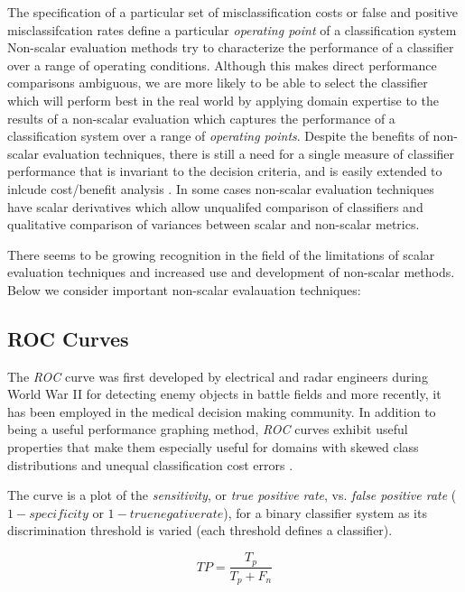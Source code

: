 \documentclass[10pt]{unbthesis}
\begin{document}
The specification of a particular set of
misclassification costs or false and positive misclassifcation rates
define a particular \textit{operating point} of a classification system
Non-scalar evaluation methods try to characterize the performance of a
classifier over a range of operating conditions. Although this makes
direct performance comparisons ambiguous, we are more likely to be
able to select the classifier which will perform best in the real
world by applying domain expertise to the results of a non-scalar
evaluation which captures the performance of a classification system over a range
of \textit{operating points}. Despite the benefits of non-scalar
evaluation techniques, there is still a need for a single measure of
classifier performance that is invariant to the decision criteria, and
is easily extended to inlcude cost/benefit analysis
\cite{Refworks:32}. In some cases non-scalar evaluation techniques
have scalar derivatives which allow unqualifed comparison of
classifiers and qualitative comparison of variances between scalar and
non-scalar metrics.

There seems to be growing recognition in the field of the limitations
of scalar evaluation techniques and increased use and development of
non-scalar methods. Below we consider important non-scalar evalauation
techniques:

\subsection{ROC Curves}
The \textit{ROC} curve was first developed by electrical and radar
engineers during World War II for detecting enemy objects in battle
fields and more recently, it has been employed in the medical decision
making community. In addition to being a useful performance graphing
method, \textit{ROC} curves exhibit useful properties that make them
especially useful for domains with skewed class distributions and
unequal classification cost errors \cite{Refworks:39}. 

The curve is a plot of the \textit{sensitivity}, or \textit{true
  positive rate}, vs. \textit{false positive rate} (\(1 −
specificity\) or \(1 - true negative rate\)), for a binary classifier
system as its discrimination threshold is varied (each threshold
defines a classifier).

\begin{equation}
\label{equ:truepositiverate}
TP = \frac{T_p}{T_p + F_n}
\end{equation}
\end{document}
